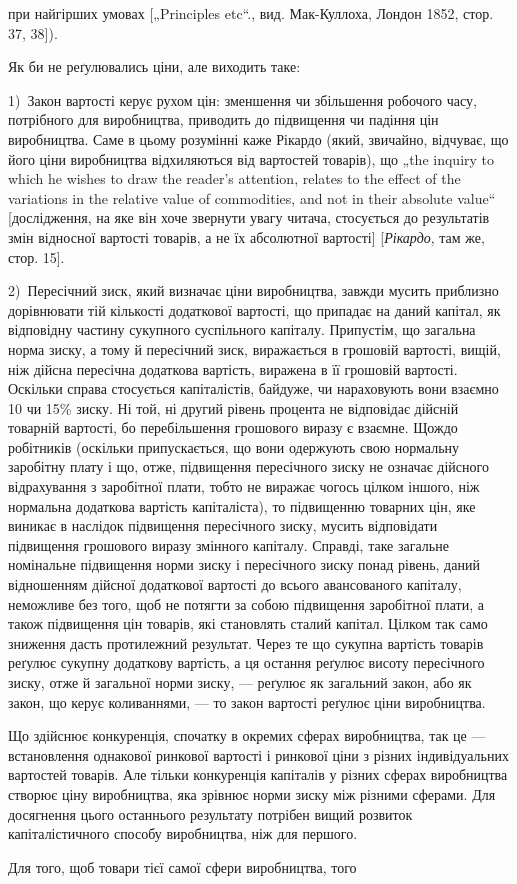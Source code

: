 \parcont{}  %
при найгірших умовах [„Principles etc“., вид. Мак-Куллоха, Лондон
1852, стор. 37, 38]).

Як би не реґулювались ціни, але виходить таке:

1)~Закон вартості керує рухом цін: зменшення чи збільшення
робочого часу, потрібного для виробництва, приводить до підвищення
чи падіння цін виробництва. Саме в цьому розумінні
каже Рікардо (який, звичайно, відчуває, що його ціни виробництва
відхиляються від вартостей товарів), що „the inquiry to
which he wishes to draw the reader’s attention, relates to the effect
of the variations in the relative value of commodities, and not in
their absolute value“ [дослідження, на яке він хоче звернути увагу
читача, стосується до результатів змін відносної вартості товарів,
а не їх абсолютної вартості] [\emph{Рікардо}, там же, стор. 15].

2)~Пересічний зиск, який визначає ціни виробництва, завжди
мусить приблизно дорівнювати тій кількості додаткової вартості,
що припадає на даний капітал, як відповідну частину сукупного
суспільного капіталу. Припустім, що загальна норма
зиску, а тому й пересічний зиск, виражається в грошовій вартості,
вищій, ніж дійсна пересічна додаткова вартість, виражена в її
грошовій вартості. Оскільки справа стосується капіталістів, байдуже,
чи нараховують вони взаємно 10 чи 15\% зиску. Ні той,
ні другий рівень процента не відповідає дійсній товарній вартості,
бо перебільшення грошового виразу є взаємне. Щождо
робітників (оскільки припускається, що вони одержують свою
нормальну заробітну плату і що, отже, підвищення пересічного
зиску не означає дійсного відрахування з заробітної плати,
тобто не виражає чогось цілком іншого, ніж нормальна додаткова
вартість капіталіста), то підвищенню товарних цін, яке
виникає в наслідок підвищення пересічного зиску, мусить відповідати
підвищення грошового виразу змінного капіталу. Справді,
таке загальне номінальне підвищення норми зиску і пересічного
зиску понад рівень, даний відношенням дійсної додаткової
вартості до всього авансованого капіталу, неможливе без того,
щоб не потягти за собою підвищення заробітної плати, а також
підвищення цін товарів, які становлять сталий капітал. Цілком
так само зниження дасть протилежний результат. Через те що
сукупна вартість товарів реґулює сукупну додаткову вартість,
а ця остання реґулює висоту пересічного зиску, отже й загальної
норми зиску, — реґулює як загальний закон, або як закон, що
керує коливаннями, — то закон вартості реґулює ціни виробництва.

Що здійснює конкуренція, спочатку в окремих сферах виробництва,
так це — встановлення однакової ринкової вартості
і ринкової ціни з різних індивідуальних вартостей товарів. Але
тільки конкуренція капіталів у різних сферах виробництва створює
ціну виробництва, яка зрівнює норми зиску між різними сферами.
Для досягнення цього останнього результату потрібен вищий
розвиток капіталістичного способу виробництва, ніж для першого.

Для того, щоб товари тієї самої сфери виробництва, того
\parbreak{}  %
